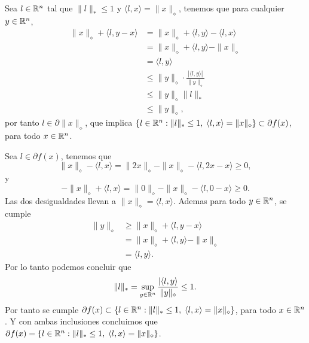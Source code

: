Sea $l \in \mathbb{R}^n$ tal que $\| l \|_{*} \leq 1$ y $\langle l, x \rangle = \| x \|_{\diamond}$,
tenemos que para cualquier $y \in \mathbb{R}^n$,
\begin{equation*}
\begin{aligned}
    \| x \|_{\diamond} + \langle l, y - x \rangle
        & = \| x \|_{\diamond} + \langle l, y \rangle - \langle l, x \rangle \\
        & = \| x \|_{\diamond} + \langle l, y \rangle - \| x \|_{\diamond} \\
        & = \langle l, y \rangle \\ 
        & \leq \| y \|_{\diamond} \cdot \frac{|\langle l, y \rangle|}{\| y \|_{\diamond}} \\
        & \leq \| y \|_{\diamond} \| l \|_{*} \\
        & \leq \| y \|_{\diamond},
\end{aligned}
\end{equation*}
por tanto $l \in \partial \| x \|_{\diamond}$,
que implica $\{ l \in \mathbb{R}^n : \| l \|_{*} \leq 1, \; \langle l, x \rangle = \| x \|_{\diamond} \} \subset \partial f(x)$,
para todo $x \in \mathbb{R}^n$.

Sea $l \in \partial f(x)$,
tenemos que
\begin{equation*}
    \| x \|_{\diamond} - \langle l, x \rangle 
        = \| 2x \|_{\diamond} - \| x \|_{\diamond} - \langle l, 2x - x \rangle
        \geq 0,
\end{equation*}
y
\begin{equation*}
    - \| x \|_{\diamond} + \langle l, x \rangle 
        = \| 0 \|_{\diamond} - \| x \|_{\diamond} - \langle l, 0 - x \rangle
        \geq 0.
\end{equation*}
Las dos desigualdades llevan a $\| x \|_{\diamond} = \langle l, x \rangle$.
Ademas para todo $y \in \mathbb{R}^n$, se cumple
\begin{equation*}
\begin{aligned}
    \| y \|_{\diamond}
        & \geq \| x \|_{\diamond} + \langle l, y - x \rangle \\
        & = \| x \|_{\diamond} + \langle l, y \rangle - \| x \|_{\diamond} \\
        & = \langle l, y \rangle.
\end{aligned}
\end{equation*}
Por lo tanto podemos concluir que
\begin{equation*}
    \| l \|_{*} 
        = \sup_{y \in \mathbb{R}^n} \frac{|\langle l, y \rangle}{\| y \|_{\diamond}} 
        \leq 1.
\end{equation*}
Por tanto se cumple $\partial f(x) \subset \{ l \in \mathbb{R}^n : \| l \|_{*} \leq 1, \; \langle l, x \rangle = \| x \|_{\diamond} \}$, para todo $x \in \mathbb{R}^n$.
Y con ambas inclusiones concluimos que $\partial f(x) = \{ l \in \mathbb{R}^n : \| l \|_{*} \leq 1, \; \langle l, x \rangle = \| x \|_{\diamond} \}$.
